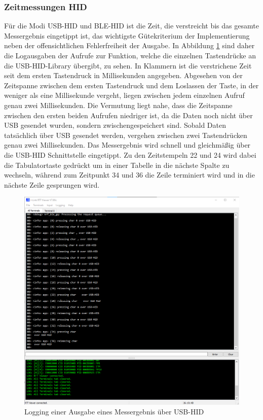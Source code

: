 \subsubsection{Zeitmessungen HID}
Für die Modi \ac{USB}-\ac{HID} und \ac{BLE}-\ac{HID} ist die Zeit, die verstreicht bis das gesamte Messergebnis eingetippt ist, das wichtigste Gütekriterium der Implementierung neben der offensichtlichen Fehlerfreiheit der Ausgabe. In Abbildung \ref{fig:LoggingAusgabeMessergebnisUSBHID} sind daher die Logausgaben der Aufrufe zur Funktion, welche die einzelnen Tastendrücke an die \ac{USB}-\ac{HID}-Library übergibt, zu sehen. In Klammern ist die verstrichene Zeit seit dem ersten Tastendruck in Millisekunden angegeben. Abgesehen von der Zeitspanne zwischen dem ersten Tastendruck und dem Loslassen der Taste, in der weniger als eine Millisekunde vergeht, liegen zwischen jedem einzelnen Aufruf genau zwei Millisekunden. Die Vermutung liegt nahe, dass die Zeitspanne zwischen den ersten beiden Aufrufen niedriger ist, da die Daten noch nicht über \ac{USB} gesendet wurden, sondern zwischengespeichert sind. Sobald Daten tatsächlich über \ac{USB} gesendet werden, vergehen zwischen zwei Tastendrücken genau zwei Millisekunden. Das Messergebnis wird schnell und gleichmäßig über die \ac{USB}-\ac{HID} Schnittstelle eingetippt. Zu den Zeitstempeln 22 und 24 wird dabei die Tabulatortaste gedrückt um in einer Tabelle in die nächste Spalte zu wechseln, während zum Zeitpunkt 34 und 36 die Zeile terminiert wird und in die nächste Zeile gesprungen wird.
\begin{figure}[H] 
	\centering
	\includegraphics[width=\textwidth]{figures/USBHID.png}
	\caption{Logging einer Ausgabe eines Messergebnis über USB-HID}
	\label{fig:LoggingAusgabeMessergebnisUSBHID}
\end{figure}

